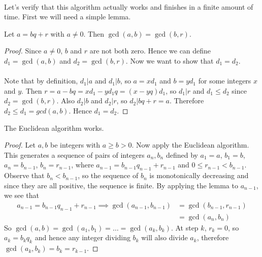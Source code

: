 \documentclass[../abstract_algebra.tex]{subfiles}
\begin{document}
        \paragraph{}
        Let's verify that this algorithm actually works and finishes in a finite amount of time.
        First we will need a simple lemma.
        \begin{lemma}
            Let $a=bq+r$ with $a\neq0$. Then $\gcd(a,b)=\gcd(b,r)$.
        \end{lemma}
        \begin{proof}
            Since $a\neq0$, $b$ and $r$ are not both zero.
            Hence we can define $d_1=\gcd(a,b)$ and $d_2=\gcd(b,r)$.
            Now we want to show that $d_1=d_2$.

            \paragraph{}
            Note that by definition, $d_1|a$ and $d_1|b$, so $a=xd_1$ and $b=yd_1$ for some integers $x$ and $y$.
            Then $r=a-bq=xd_1-yd_1q=(x-yq)d_1$, so $d_1|r$ and $d_1\leq d_2$ since $d_2=\gcd(b,r)$.
            Also $d_2|b$ and $d_2|r$, so $d_2|bq+r=a$.
            Therefore $d_2\leq d_1=gcd(a,b)$.
            Hence $d_1=d_2$.
        \end{proof}
        \begin{theorem}
            The Euclidean algorithm works.
        \end{theorem}
        \begin{proof}
            Let $a,b$ be integers with $a\geq b>0$. Now apply the Euclidean algorithm.
            This generates a sequence of pairs of integers $a_n,b_n$ defined by $a_1=a$, $b_1=b$, $a_n=b_{n-1}$, $b_n=r_{n-1}$, where $a_{n-1}=b_{n-1}q_{n-1}+r_{n-1}$ and $0\leq r_{n-1}<b_{n-1}$.
            Observe that $b_n<b_{n-1}$, so the sequence of $b_n$ is monotonically decreasing and since they are all positive, the sequence is finite.
            By applying the lemma to $a_{n-1}$, we see that
            \begin{align}
                a_{n-1}=b_{n-1}q_{n-1}+r_{n-1}\implies\gcd(a_{n-1},b_{n-1})&=\gcd(b_{n-1},r_{n-1})\\
                &=\gcd(a_n,b_n)
            \end{align}
            So $\gcd(a,b)=\gcd(a_1,b_1)=\dots=\gcd(a_k,b_k)$.
            At step $k$, $r_k=0$, so $a_k=b_kq_k$ and hence any integer dividing $b_k$ will also divide $a_k$, therefore $\gcd(a_k,b_k)=b_k=r_{k-1}$.
        \end{proof}
\end{document}
